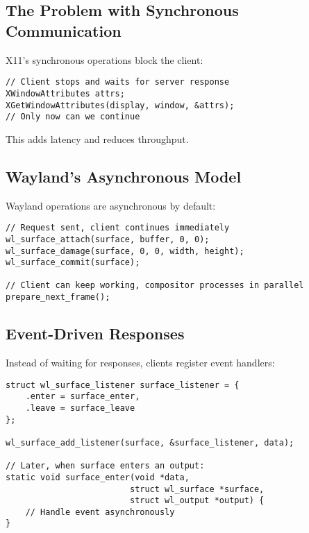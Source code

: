\subsection{The Problem with Synchronous Communication}

X11's synchronous operations block the client:

\begin{lstlisting}[style=cstyle, caption=X11 Blocking Call]
// Client stops and waits for server response
XWindowAttributes attrs;
XGetWindowAttributes(display, window, &attrs);
// Only now can we continue
\end{lstlisting}

This adds latency and reduces throughput.

\subsection{Wayland's Asynchronous Model}

Wayland operations are asynchronous by default:

\begin{lstlisting}[style=cstyle, caption=Asynchronous Wayland]
// Request sent, client continues immediately
wl_surface_attach(surface, buffer, 0, 0);
wl_surface_damage(surface, 0, 0, width, height);
wl_surface_commit(surface);

// Client can keep working, compositor processes in parallel
prepare_next_frame();
\end{lstlisting}

\subsection{Event-Driven Responses}

Instead of waiting for responses, clients register event handlers:

\begin{lstlisting}[style=cstyle, caption=Event Handlers]
struct wl_surface_listener surface_listener = {
    .enter = surface_enter,
    .leave = surface_leave
};

wl_surface_add_listener(surface, &surface_listener, data);

// Later, when surface enters an output:
static void surface_enter(void *data,
                         struct wl_surface *surface,
                         struct wl_output *output) {
    // Handle event asynchronously
}
\end{lstlisting}

